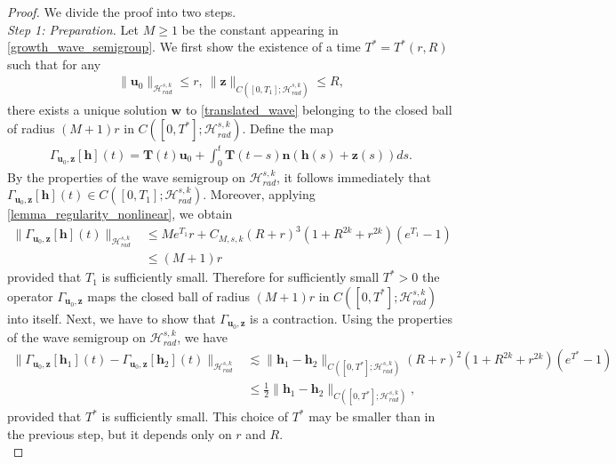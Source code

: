 \documentclass[12pt,reqno]{amsart}
\theoremstyle{plain}
\theoremstyle{remark}
\theoremstyle{plain}
\theoremstyle{definition}
\numberwithin{equation}{section}
\numberwithin{equation}{section}
\newcommand{\HH}{\mathcal{H}}
\begin{document}
	\begin{proof}
		We divide the proof into two steps.\\
		\emph{Step 1: Preparation.} Let $M\geq 1$ be the constant appearing in \eqref{growth_wave_semigroup}. We first show the existence of a time $T^{*}=T^{*}(r,R)$ such that for any
		\begin{align*}
			\lVert \mathbf{u}_0\rVert_{\HH_{rad}^{s,k}}\leq r,\ \lVert \mathbf{z}\rVert_{C([0,T_1];\HH_{rad}^{s,k})}\leq R,
		\end{align*}
		there exists a unique solution $\mathbf{w}$ to \eqref{translated_wave} belonging to the closed ball of radius $(M+1)r$ in $C([0, T^*]; \HH_{rad}^{s,k})$. Define the map 
		\begin{align*}
			\Gamma_{\mathbf{u}_0,\mathbf{z}} [\mathbf{h}](t)=\mathbf{T}(t)\mathbf{u}_0+\int_0^t \mathbf{T}(t-s) \mathbf{n}(\mathbf{h}(s)+\mathbf{z}(s))ds.
		\end{align*}
		By the properties of the wave semigroup on $\HH_{rad}^{s,k}$, it follows immediately that $\Gamma_{\mathbf{u}_0,\mathbf{z}} [\mathbf{h}](t)\in C([0,T_1];\HH_{rad}^{s,k})$. Moreover, applying \autoref{lemma_regularity_nonlinear}, we obtain
		\begin{align*}
			\lVert\Gamma_{\mathbf{u}_0,\mathbf{z}} [\mathbf{h}](t)\rVert_{\HH_{rad}^{s,k}}&\leq  M e^{T_1} r+C_{M,s,k}\left(R+r\right)^3(1+R^{2k}+r^{2k})(e^{T_1}-1)\\ & \leq  (M+1)r
		\end{align*}
		provided that $T_1$ is sufficiently small. Therefore for sufficiently small $T^*>0$ the operator $\Gamma_{\mathbf{u}_0,\mathbf{z}}$ maps the closed ball of radius $(M+1)r$ in $C([0,T^*];\HH_{rad}^{s,k})$ into itself. Next, we have to show that $\Gamma_{\mathbf{u}_0,\mathbf{z}}$ is a contraction. Using the properties of the wave semigroup on $\HH_{rad}^{s,k}$, we have
		\begin{align*}
			\lVert\Gamma_{\mathbf{u}_0,\mathbf{z}} [\mathbf{h}_1](t)-\Gamma_{\mathbf{u}_0,\mathbf{z}} [\mathbf{h}_2](t)\rVert_{\HH_{rad}^{s,k}}& \lesssim \lVert \mathbf{h}_1-\mathbf{h}_2\rVert_{C([0,T^*];\HH_{rad}^{s,k})} \left(R+r\right)^2(1+R^{2k}+r^{2k})(e^{T^*}-1)  \\ & \leq \frac{1}{2}\lVert\mathbf{h}_1-\mathbf{h}_2\rVert_{C([0,T^*];\HH_{rad}^{s,k})}, 
		\end{align*}
		provided that $T^*$ is sufficiently small. This choice of $T^*$ may be smaller than in the previous step, but it depends only on $r$ and $R$.\\

\end{proof}
\end{document}

